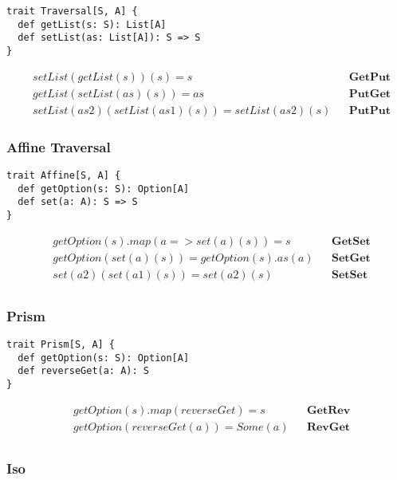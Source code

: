 \documentclass[a4paper]{article}
\begin{document}
\begin{lstlisting}
trait Traversal[S, A] {
  def getList(s: S): List[A]
  def setList(as: List[A]): S => S
}
\end{lstlisting}

\begin{align*}
  & setList(getList(s))(s) = s &&\textbf{GetPut} \\
  & getList(setList(as)(s)) = as &&\textbf{PutGet} \\
  & setList(as2)(setList(as1)(s)) = setList(as2)(s) &&\textbf{PutPut}
\end{align*}

\subsubsection{Affine Traversal}

\begin{lstlisting}
trait Affine[S, A] {
  def getOption(s: S): Option[A]
  def set(a: A): S => S
}
\end{lstlisting}

\begin{align*}
  & getOption(s).map(a => set(a)(s)) = s &&\textbf{GetSet} \\
  & getOption(set(a)(s)) = getOption(s).as(a) &&\textbf{SetGet} \\
  & set(a2)(set(a1)(s)) = set(a2)(s) &&\textbf{SetSet} \\
\end{align*}

\subsubsection{Prism}

\begin{lstlisting}
trait Prism[S, A] {
  def getOption(s: S): Option[A]
  def reverseGet(a: A): S
}
\end{lstlisting}

\begin{align*}
  & getOption(s).map(reverseGet) = s &&\textbf{GetRev} \\
  & getOption(reverseGet(a)) = Some(a) &&\textbf{RevGet} \\
\end{align*}

\subsubsection{Iso}
\end{document}
